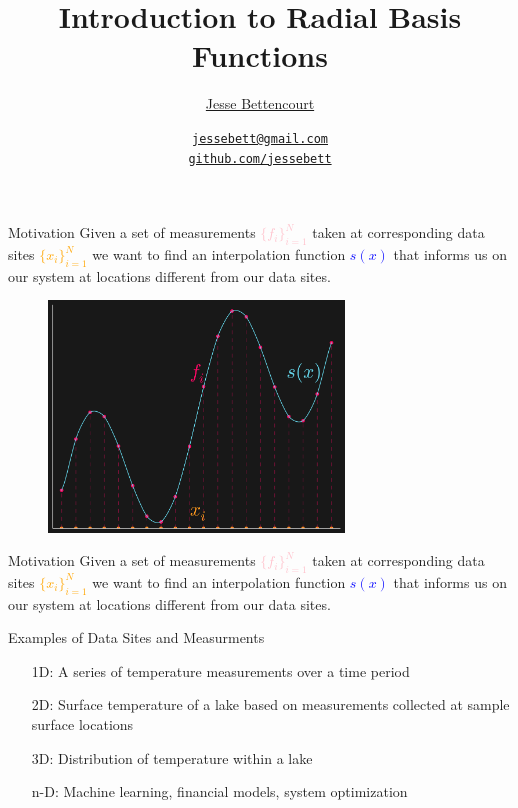 \documentclass[12pt,t]{beamer}
\title{Introduction to Radial Basis Functions}
\subtitle{}
\author{\href{https://github.com/jessebett/}{Jesse Bettencourt}}
\institute{McMaster University}
\date{\href{jessebett@gmail.com}{\tt \scriptsize jessebett@gmail.com}
\\[-4pt]
\href{http://github.com/jessebett}{\tt \scriptsize github.com/jessebett}
}
\newcommand{\subt}[1]{{\footnotesize \color{subtitle} {#1}}}
\begin{document}
\begin{frame}
  \titlepage
  \note{}
\end{frame}

\begin{frame}{Motivation}
Given a set of measurements \textcolor{pink}{$\{f_i\}_{i=1}^N$}
taken at corresponding data sites \textcolor{orange}{$\{x_i\}_{i=1}^N$}
we want to find an interpolation function \textcolor{blue}{$s(x)$}
that informs us on our system at locations different from our data sites.\\
\bigskip 

\begin{figure}
\includegraphics[width=0.7\textwidth, keepaspectratio]{fig1.png}
\end{figure}

\note{}
\end{frame}
\begin{frame}{Motivation}
Given a set of measurements \textcolor{pink}{$\{f_i\}_{i=1}^N$}
taken at corresponding data sites \textcolor{orange}{$\{x_i\}_{i=1}^N$}
we want to find an interpolation function \textcolor{blue}{$s(x)$}
that informs us on our system at locations different from our data sites.\\
\bigskip 

\subt{Examples of Data Sites and Measurments}
\begin{itemize}
\item[1D:] A series of temperature measurements over a time period
\item[2D:] Surface temperature of a lake based on measurements collected at sample surface locations 
\item[3D:] Distribution of temperature within a lake
\item[n-D:] Machine learning, financial models, system optimization
\end{itemize}

\note{}
\end{frame}
\end{document}
